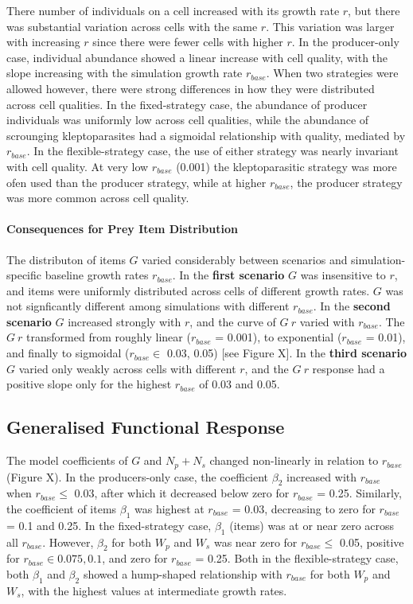 \documentclass[11pt]{article}
\begin{document}
There number of individuals on a cell increased with its growth rate $r$, but there was substantial variation across cells with the same $r$. 
This variation was larger with increasing $r$ since there were fewer cells with higher $r$.
In the producer-only case, individual abundance showed a linear increase with cell quality, with the slope increasing with the simulation growth rate $r_{base}$.
When two strategies were allowed however, there were strong differences in how they were distributed across cell qualities.
In the fixed-strategy case, the abundance of producer individuals was uniformly low across cell qualities, while the abundance of scrounging kleptoparasites had a sigmoidal relationship with quality, mediated by $r_{base}$.
In the flexible-strategy case, the use of either strategy was nearly invariant with cell quality.
At very low $r_{base}$ (0.001) the kleptoparasitic strategy was more ofen used than the producer strategy, while at higher $r_{base}$, the producer strategy was more common across cell quality.

\paragraph{Consequences for Prey Item Distribution}

The distributon of items $G$ varied considerably between scenarios and simulation-specific baseline growth rates $r_{base}$.
In the \textbf{first scenario} $G$ was insensitive to $r$, and items were uniformly distributed across cells of different growth rates.
$G$ was not signficantly different among simulations with different $r_{base}$.
In the \textbf{second scenario} $G$ increased strongly with $r$, and the curve of $G ~ r$ varied with $r_{base}$.
The $G ~ r$ transformed from roughly linear ($r_{base}$ = 0.001), to exponential ($r_{base}$ = 0.01), and finally to sigmoidal ($r_{base} \in$ 0.03, 0.05) [see Figure X].
In the \textbf{third scenario} $G$ varied only weakly across cells with different $r$, and the $G ~ r$ response had a positive slope only for the highest $r_{base}$ of 0.03 and 0.05.

\subsection*{Generalised Functional Response}

The model coefficients of $G$ and $N_p + N_s$ changed non-linearly in relation to $r_{base}$ (Figure X).
In the producers-only case, the coefficient $\beta_2$ increased with $r_{base}$ when $r_{base} \leq$ 0.03, after which it decreased below zero for $r_{base}$ = 0.25.
Similarly, the coefficient of items $\beta_1$ was highest at $r_{base}$ = 0.03, decreasing to zero for $r_{base}$ = 0.1 and 0.25.
In the fixed-strategy case, $\beta_1$ (items) was at or near zero across all $r_{base}$.
However, $\beta_2$ for both $W_p$ and $W_s$ was near zero for $r_{base} \leq$ 0.05, positive for $r_{base} \in 0.075, 0.1$, and zero for $r_{base}$ = 0.25.
Both in the flexible-strategy case, both $\beta_1$ and $\beta_2$ showed a hump-shaped relationship with $r_{base}$ for both $W_p$ and $W_s$, with the highest values at intermediate growth rates.
\end{document}
